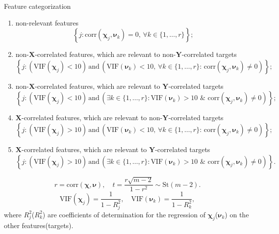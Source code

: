 \documentclass[9pt]{beamer}
\newcommand{\bY}{\mathbf{Y}}
\newcommand{\bX}{\mathbf{X}}
\newcommand{\bchi}{\boldsymbol{\chi}}
\newcommand{\bnu}{\boldsymbol{\nu}}
\begin{document}
\begin{frame}{Feature categorization}
\begin{enumerate}
	\item non-relevant features
	\[
	\left\{j: \text{corr}(\bchi_j, \bnu_k) = 0, \, \forall k \in \{1, \dots, r\}\right\};
	\]
	\item non-$\bX$-correlated features, which are relevant to non-$\bY$-correlated targets
	\[
	\left\{j: \left(\text{VIF}(\bchi_j) < 10\right) \, \text{and} \, \left(\text{VIF}(\bnu_k) < 10 , \, \forall k \in \{1, \dots, r\}: \,  \text{corr}(\bchi_j, \bnu_k) \neq 0 \right)\right\};
	\]
	\item non-$\bX$-correlated features, which are relevant to $\bY$-correlated targets
	\[
	\left\{j: \left(\text{VIF}(\bchi_j) < 10\right) \, \text{and} \, \left( \exists k \in \{1, \dots, r\}: \text{VIF}(\bnu_k) > 10 \,\, \& \,\, \text{corr}(\bchi_j, \bnu_k) \neq 0 \right)\right\};
	\]
	\item $\bX$-correlated features, which are relevant to non-$\bY$-correlated targets
	\[
	\left\{j: \left(\text{VIF}(\bchi_j) > 10\right) \, \text{and} \, \left(\text{VIF}(\bnu_k) < 10 , \, \forall k \in \{1, \dots, r\}: \,  \text{corr}(\bchi_j, \bnu_k) \neq 0 \right)\right\};
	\]
	\item $\bX$-correlated features, which are relevant to $\bY$-correlated targets
	\[
	\left\{j: \left(\text{VIF}(\bchi_j) > 10\right) \, \text{and} \, \left( \exists k \in \{1, \dots, r\}: \text{VIF}(\bnu_k) > 10 \,\, \& \,\, \text{corr}(\bchi_j, \bnu_k) \neq 0 \right)\right\}.
	\]
\end{enumerate}

\[
r = \text{corr} (\bchi, \bnu), \quad t = \frac{r \sqrt{m - 2}}{1 - r^2} \sim \text{St} (m - 2).
\]
\[
\text{VIF}(\bchi_j) = \frac{1}{1 - R_j^2}, \quad \text{VIF}(\bnu_k) = \frac{1}{1 - R_k^2},
\]
where $R_j^2$($R_k^2$) are coefficients of determination for the regression of $\bchi_j$($\bnu_k$) on the other features(targets).
\end{frame}
\end{document}
